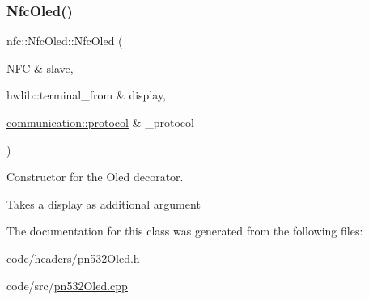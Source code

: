 \subsubsection{\texorpdfstring{Nfc\+Oled()}{NfcOled()}}
{\footnotesize\ttfamily nfc\+::\+Nfc\+Oled\+::\+Nfc\+Oled (\begin{DoxyParamCaption}\item[{\hyperlink{classnfc_1_1NFC}{N\+FC} \&}]{slave,  }\item[{hwlib\+::terminal\+\_\+from \&}]{display,  }\item[{\hyperlink{classcommunication_1_1protocol}{communication\+::protocol} \&}]{\+\_\+protocol }\end{DoxyParamCaption})}



Constructor for the Oled decorator. 

Takes a display as additional argument 

The documentation for this class was generated from the following files\+:\begin{DoxyCompactItemize}
\item 
code/headers/\hyperlink{pn532Oled_8h}{pn532\+Oled.\+h}\item 
code/src/\hyperlink{pn532Oled_8cpp}{pn532\+Oled.\+cpp}\end{DoxyCompactItemize}
